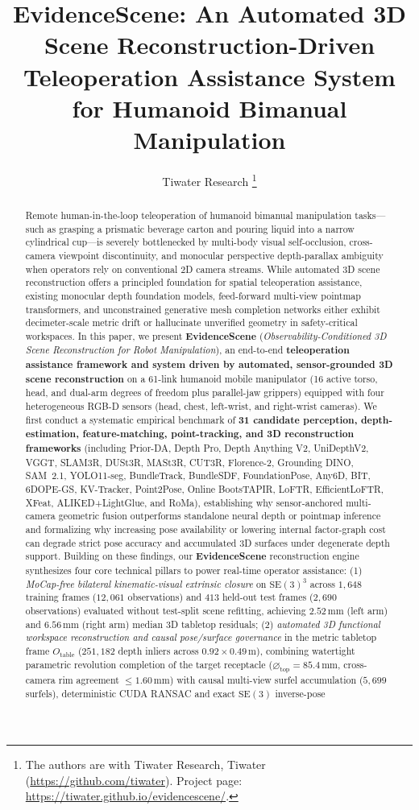 \documentclass[10pt,journal]{IEEEtran}
\title{EvidenceScene: An Automated 3D Scene Reconstruction-Driven Teleoperation Assistance System for Humanoid Bimanual Manipulation}
\author{Tiwater Research%
\thanks{The authors are with Tiwater Research, Tiwater (\url{https://github.com/tiwater}). Project page: \url{https://tiwater.github.io/evidencescene/}.}}
\begin{document}
\maketitle

\begin{abstract}
Remote human-in-the-loop teleoperation of humanoid bimanual manipulation tasks---such as grasping a prismatic beverage carton and pouring liquid into a narrow cylindrical cup---is severely bottlenecked by multi-body visual self-occlusion, cross-camera viewpoint discontinuity, and monocular perspective depth-parallax ambiguity when operators rely on conventional 2D camera streams. While automated 3D scene reconstruction offers a principled foundation for spatial teleoperation assistance, existing monocular depth foundation models, feed-forward multi-view pointmap transformers, and unconstrained generative mesh completion networks either exhibit decimeter-scale metric drift or hallucinate unverified geometry in safety-critical workspaces. In this paper, we present \textbf{EvidenceScene} (\emph{Observability-Conditioned 3D Scene Reconstruction for Robot Manipulation}), an end-to-end \textbf{teleoperation assistance framework and system driven by automated, sensor-grounded 3D scene reconstruction} on a 61-link humanoid mobile manipulator (16 active torso, head, and dual-arm degrees of freedom plus parallel-jaw grippers) equipped with four heterogeneous RGB-D sensors (head, chest, left-wrist, and right-wrist cameras). We first conduct a systematic empirical benchmark of \textbf{31 candidate perception, depth-estimation, feature-matching, point-tracking, and 3D reconstruction frameworks} (including Prior-DA, Depth Pro, Depth Anything V2, UniDepthV2, VGGT, SLAM3R, DUSt3R, MASt3R, CUT3R, Florence-2, Grounding DINO, SAM~2.1, YOLO11-seg, BundleTrack, BundleSDF, FoundationPose, Any6D, BIT, 6DOPE-GS, KV-Tracker, Point2Pose, Online BootsTAPIR, LoFTR, EfficientLoFTR, XFeat, ALIKED+LightGlue, and RoMa), establishing why sensor-anchored multi-camera geometric fusion outperforms standalone neural depth or pointmap inference and formalizing why increasing pose availability or lowering internal factor-graph cost can degrade strict pose accuracy and accumulated 3D surfaces under degenerate depth support. Building on these findings, our \textbf{EvidenceScene} reconstruction engine synthesizes four core technical pillars to power real-time operator assistance: (1) \emph{MoCap-free bilateral kinematic-visual extrinsic closure} on $\mathrm{SE}(3)^3$ across $1{,}648$ training frames ($12{,}061$ observations) and $413$ held-out test frames ($2{,}690$ observations) evaluated without test-split scene refitting, achieving $2.52\,\mathrm{mm}$ (left arm) and $6.56\,\mathrm{mm}$ (right arm) median 3D tabletop residuals; (2) \emph{automated 3D functional workspace reconstruction and causal pose/surface governance} in the metric tabletop frame $O_{\mathrm{table}}$ ($251{,}182$ depth inliers across $0.92\times 0.49\,\mathrm{m}$), combining watertight parametric revolution completion of the target receptacle ($\varnothing_{\mathrm{top}} = 85.4\,\mathrm{mm}$, cross-camera rim agreement $\le 1.60\,\mathrm{mm}$) with causal multi-view surfel accumulation ($5{,}699$ surfels), deterministic CUDA RANSAC and exact $\mathrm{SE}(3)$ inverse-pose 
\end{abstract}
\end{document}
